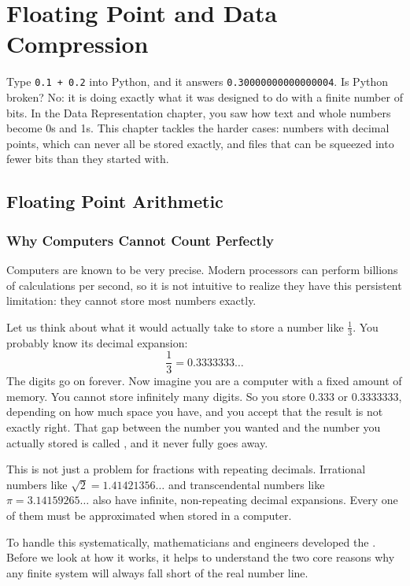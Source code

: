 \chapter{Floating Point and Data Compression}

Type \verb|0.1 + 0.2| into Python, and it answers \verb|0.30000000000000004|. Is Python broken? No: it is doing
exactly what it was designed to do with a finite number of bits. In the Data Representation chapter, you saw
how text and whole numbers become 0s and 1s. This chapter tackles the harder cases: numbers with decimal points,
which can never all be stored exactly, and files that can be squeezed into fewer bits than they started with.

\section{Floating Point Arithmetic}
\subsection{Why Computers Cannot Count Perfectly}

Computers are known to be very precise. Modern processors can perform billions of calculations per second, so it is not intuitive to realize they have this persistent limitation: they cannot store most numbers exactly.

Let us think about what it would actually take to store a number like $\frac{1}{3}$. You
probably know its decimal expansion:
\[
    \frac{1}{3} = 0.3333333\ldots\]
The digits go on forever. Now imagine you are a computer with a fixed amount of memory.
You cannot store infinitely many digits. So you store $0.333$ or $0.3333333$, depending on how much space you have, and you accept that the result is not exactly right. That gap between the number you wanted and the number you
actually stored is called , and
it never fully goes away.

This is not just a problem for fractions with repeating decimals. Irrational numbers like
$\sqrt{2} = 1.41421356\ldots$ and transcendental numbers like $\pi = 3.14159265\ldots$
also have infinite, non-repeating decimal expansions. Every one of them must be
approximated when stored in a computer.

To handle this systematically, mathematicians and engineers developed the
. Before we look at how it works, it helps to understand the two core reasons why any finite system will always fall short of
the real number line.

